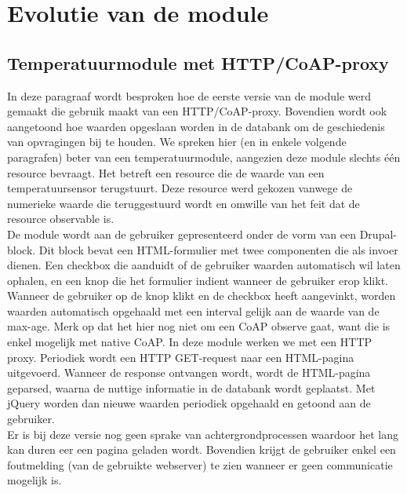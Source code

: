 \section{Evolutie van de module} \label{evolutie}

\subsection{Temperatuurmodule met HTTP/CoAP-proxy} \label{proxy}
In deze paragraaf wordt besproken hoe de eerste versie van de module werd gemaakt die gebruik maakt van een HTTP/CoAP-proxy. Bovendien wordt ook aangetoond hoe waarden opgeslaan worden in de databank om de geschiedenis van opvragingen bij te houden. We spreken hier (en in enkele volgende paragrafen) beter van een temperatuurmodule, aangezien deze module slechts \'{e}\'{e}n resource bevraagt. Het betreft een resource die de waarde van een temperatuursensor terugstuurt. Deze resource werd gekozen vanwege de numerieke waarde die teruggestuurd wordt en omwille van het feit dat de resource observable is.\\

De module wordt aan de gebruiker gepresenteerd onder de vorm van een Drupal-block. Dit block bevat een HTML-formulier met twee componenten die als invoer dienen. Een checkbox die aanduidt of de gebruiker waarden automatisch wil laten ophalen, en een knop die het formulier indient wanneer de gebruiker erop klikt.\\
Wanneer de gebruiker op de knop klikt en de checkbox heeft aangevinkt, worden waarden automatisch opgehaald met een interval gelijk aan de waarde van de max-age. Merk op dat het hier nog niet om een CoAP observe gaat, want die is enkel mogelijk met native CoAP. In deze module werken we met een HTTP proxy. Periodiek wordt een HTTP GET-request naar een HTML-pagina uitgevoerd. Wanneer de response ontvangen wordt, wordt de HTML-pagina geparsed, waarna de nuttige informatie in de databank wordt geplaatst. Met jQuery worden dan nieuwe waarden periodiek opgehaald en getoond aan de gebruiker.\\

Er is bij deze versie nog geen sprake van achtergrondprocessen waardoor het lang kan duren eer een pagina geladen wordt. Bovendien krijgt de gebruiker enkel een foutmelding (van de gebruikte webserver) te zien wanneer er geen communicatie mogelijk is.

